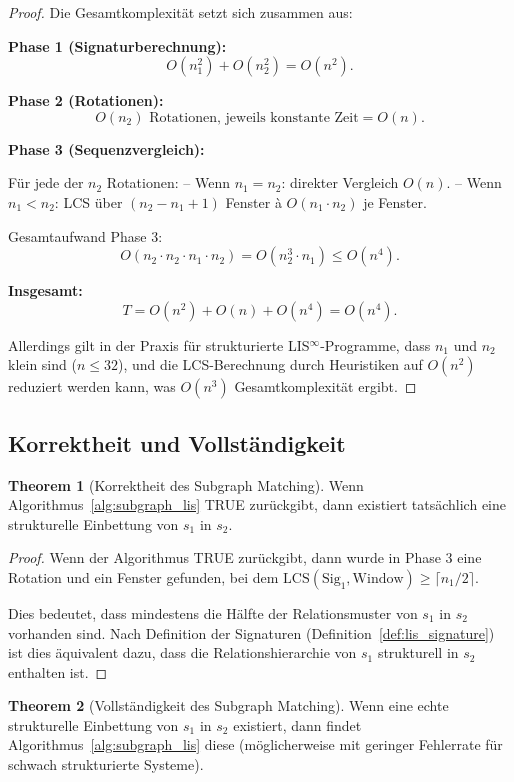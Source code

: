 \documentclass[a4paper,12pt]{article}
\theoremstyle{definition}
\newtheorem{theorem}{Theorem}
\begin{document}
\begin{proof}
	Die Gesamtkomplexität setzt sich zusammen aus:
	
	\textbf{Phase 1 (Signaturberechnung):}
	\[
	O(n_1^2) + O(n_2^2) = O(n^2).
	\]
	
	\textbf{Phase 2 (Rotationen):}
	\[
	O(n_2) \text{ Rotationen, jeweils konstante Zeit} = O(n).
	\]
	
	\textbf{Phase 3 (Sequenzvergleich):}
	
	Für jede der $n_2$ Rotationen:
	-- Wenn $n_1 = n_2$: direkter Vergleich $O(n)$.
	-- Wenn $n_1 < n_2$: LCS über $(n_2 - n_1 + 1)$ Fenster à $O(n_1 \cdot n_2)$ je Fenster.
	
	Gesamtaufwand Phase 3:
	\[
	O(n_2 \cdot n_2 \cdot n_1 \cdot n_2) = O(n_2^3 \cdot n_1) \leq O(n^4).
	\]
	
	\textbf{Insgesamt:}
	\[
	T = O(n^2) + O(n) + O(n^4) = O(n^4).
	\]
	
	Allerdings gilt in der Praxis für strukturierte LIS$^{\infty}$-Programme, dass $n_1$ und $n_2$ klein sind ($n \leq 32$), und die LCS-Berechnung durch Heuristiken auf $O(n^2)$ reduziert werden kann, was $O(n^3)$ Gesamtkomplexität ergibt.
\end{proof}

\subsection{Korrektheit und Vollständigkeit}

\begin{theorem}[Korrektheit des Subgraph Matching]
	\label{thm:subgraph_soundness}
	Wenn Algorithmus~\ref{alg:subgraph_lis} TRUE zurückgibt, dann existiert tatsächlich eine strukturelle Einbettung von $s_1$ in $s_2$.
\end{theorem}

\begin{proof}
	Wenn der Algorithmus TRUE zurückgibt, dann wurde in Phase 3 eine Rotation und ein Fenster gefunden, bei dem $\text{LCS}(\text{Sig}_1, \text{Window}) \geq \lceil n_1 / 2 \rceil$.
	
	Dies bedeutet, dass mindestens die Hälfte der Relationsmuster von $s_1$ in $s_2$ vorhanden sind. Nach Definition der Signaturen (Definition~\ref{def:lis_signature}) ist dies äquivalent dazu, dass die Relationshierarchie von $s_1$ strukturell in $s_2$ enthalten ist.
\end{proof}

\begin{theorem}[Vollständigkeit des Subgraph Matching]
	\label{thm:subgraph_completeness}
	Wenn eine echte strukturelle Einbettung von $s_1$ in $s_2$ existiert, dann findet Algorithmus~\ref{alg:subgraph_lis} diese (möglicherweise mit geringer Fehlerrate für schwach strukturierte Systeme).
\end{theorem}
\end{document}
